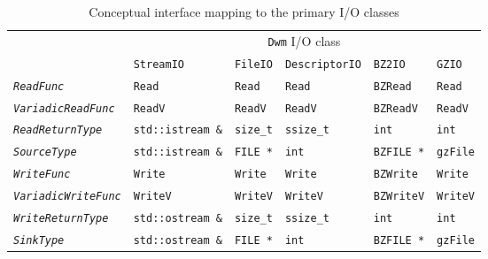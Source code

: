 \begin{table}[H]
\begin{tabular}{l|l|l|l|l|l}
  & \multicolumn{5}{c}{\texttt{Dwm} I/O class} \\
  & \texttt{StreamIO} & \texttt{FileIO} & \texttt{DescriptorIO} & \texttt{BZ2IO} & \texttt{GZIO} \\ \hline
  \texttt{\textit{\color{darkblue}ReadFunc}} & \texttt{\color{darkblue}Read} & \texttt{\color{darkblue}Read} & \texttt{\color{darkblue}Read} & \texttt{\color{darkblue}BZRead} & \texttt{\color{darkblue}Read} \\
  \texttt{\textit{\color{darkblue}VariadicReadFunc}} & \texttt{\color{darkblue}ReadV} & \texttt{\color{darkblue}ReadV} & \texttt{\color{darkblue}ReadV} & \texttt{\color{darkblue}BZReadV} & \texttt{\color{darkblue}ReadV} \\
  \texttt{\textit{\color{red1}ReadReturnType}} & \texttt{\color{red1}std::istream \&} & \texttt{\color{red1}size\_t} & \texttt{\color{red1}ssize\_t} & \texttt{\color{red1}int} & \texttt{\color{red1}int} \\
  \color{green1}\texttt{\textit{SourceType}} & \color{green1}\texttt{std::istream \&} & \color{green1}\texttt{FILE *} & \color{green1}\texttt{int} & \color{green1}\texttt{BZFILE *} & \color{green1}\texttt{gzFile} \\
  \texttt{\textit{\color{darkblue}WriteFunc}} & \texttt{\color{darkblue}Write} & \texttt{\color{darkblue}Write} & \texttt{\color{darkblue}Write} & \texttt{\color{darkblue}BZWrite} & \texttt{\color{darkblue}Write} \\
  \texttt{\textit{\color{darkblue}VariadicWriteFunc}} & \texttt{\color{darkblue}WriteV} & \texttt{\color{darkblue}WriteV} & \texttt{\color{darkblue}WriteV} & \texttt{\color{darkblue}BZWriteV} & \texttt{\color{darkblue}WriteV} \\
  \texttt{\textit{\color{red1}WriteReturnType}} & \texttt{\color{red1}std::ostream \&} & \texttt{\color{red1}size\_t} & \texttt{\color{red1}ssize\_t} & \texttt{\color{red1}int} & \texttt{\color{red1}int} \\
  \texttt{\textit{\color{green1}SinkType}} & \texttt{\color{green1}std::ostream \&} & \texttt{\color{green1}FILE *} & \texttt{\color{green1}int} & \texttt{\color{green1}BZFILE *} & \texttt{\color{green1}gzFile} \\
\end{tabular}
\caption{Conceptual interface mapping to the primary I/O classes}
\label{table:ConceptualInterfaceMapping}
\end{table}

